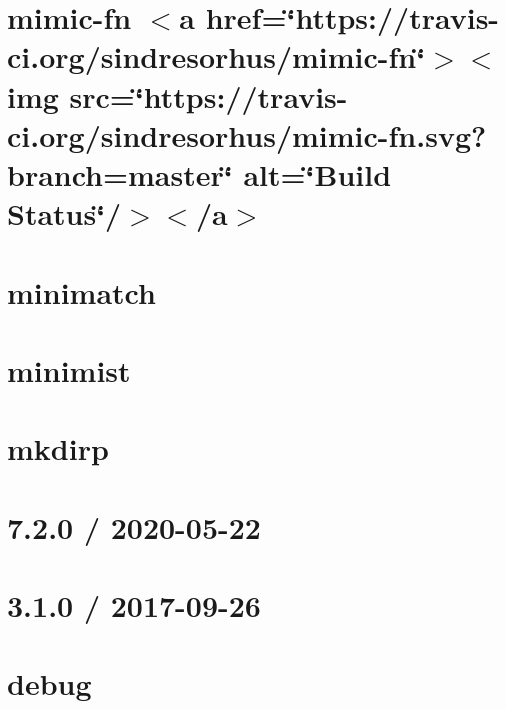 \let\mypdfximage\pdfximage\def\pdfximage{\immediate\mypdfximage}\documentclass[twoside]{book}
\newcommand{\+}{\discretionary{\mbox{\scriptsize$\hookleftarrow$}}{}{}}
\begin{document}
\chapter{mimic-\/fn $<$a href=\char`\"{}https\+://travis-\/ci.\+org/sindresorhus/mimic-\/fn\char`\"{}$>$$<$img src=\char`\"{}https\+://travis-\/ci.\+org/sindresorhus/mimic-\/fn.\+svg?branch=master\char`\"{} alt=\char`\"{}\+Build Status\char`\"{}/$>$$<$/a$>$}
\label{md_heap-visualizer_node_modules_mimic-fn_readme}

\chapter{minimatch}
\label{md_heap-visualizer_node_modules_minimatch__r_e_a_d_m_e}

\chapter{minimist}
\label{md_heap-visualizer_node_modules_minimist_readme}

\chapter{mkdirp}
\label{md_heap-visualizer_node_modules_mkdirp_readme}

\chapter{7.2.0 / 2020-\/05-\/22}
\label{md_heap-visualizer_node_modules_mocha__c_h_a_n_g_e_l_o_g}

\chapter{3.1.0 / 2017-\/09-\/26}
\label{md_heap-visualizer_node_modules_mocha_node_modules_debug__c_h_a_n_g_e_l_o_g}

\chapter{debug}
\label{md_heap-visualizer_node_modules_mocha_node_modules_debug__r_e_a_d_m_e}

\end{document}
